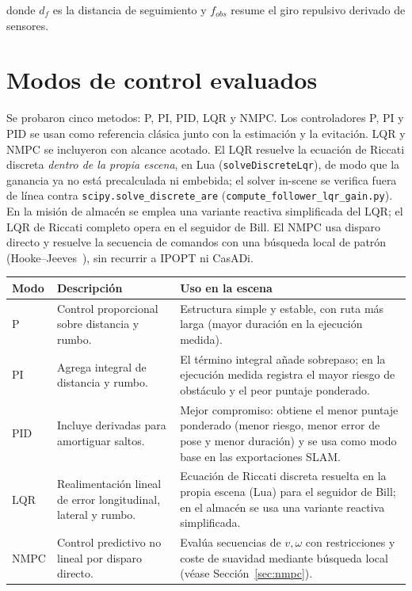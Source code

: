 donde \(d_f\) es la distancia de seguimiento y \(f_{obs}\) resume el giro
repulsivo derivado de sensores.

\section{Modos de control evaluados}

Se probaron cinco metodos: P, PI, PID, LQR y NMPC. Los controladores P, PI y PID
se usan como referencia clásica junto con la estimación y la evitación. LQR y
NMPC se incluyeron con alcance acotado. El LQR resuelve la ecuación de Riccati
discreta \emph{dentro de la propia escena}, en Lua (\texttt{solveDiscreteLqr}), de
modo que la ganancia ya no está precalculada ni embebida; el solver in-scene se
verifica fuera de línea contra \texttt{scipy.solve\_discrete\_are}
(\texttt{compute\_follower\_lqr\_gain.py}). En la misión de almacén se emplea una
variante reactiva simplificada del LQR; el LQR de Riccati completo opera en el
seguidor de Bill. El NMPC usa disparo directo y resuelve la secuencia de comandos
con una búsqueda local de patrón (Hooke--Jeeves~\cite{hooke1961}), sin recurrir a
IPOPT ni CasADi.

\begin{longtable}{P{0.17\textwidth}P{0.35\textwidth}P{0.36\textwidth}}
\toprule
\textbf{Modo} & \textbf{Descripción} & \textbf{Uso en la escena}\\
\midrule
\endhead
P & Control proporcional sobre distancia y rumbo. & Estructura simple y estable, con ruta más larga (mayor duración en la ejecución medida).\\
PI & Agrega integral de distancia y rumbo. & El término integral añade sobrepaso; en la ejecución medida registra el mayor riesgo de obstáculo y el peor puntaje ponderado.\\
PID & Incluye derivadas para amortiguar saltos. & Mejor compromiso: obtiene el menor puntaje ponderado (menor riesgo, menor error de pose y menor duración) y se usa como modo base en las exportaciones SLAM.\\
LQR & Realimentación lineal de error longitudinal, lateral y rumbo. & Ecuación de Riccati discreta resuelta en la propia escena (Lua) para el seguidor de Bill; en el almacén se usa una variante reactiva simplificada.\\
NMPC & Control predictivo no lineal por disparo directo. & Evalúa secuencias de \(v,\omega\) con restricciones y coste de suavidad mediante búsqueda local (véase Sección~\ref{sec:nmpc}).\\
\bottomrule
\end{longtable}

